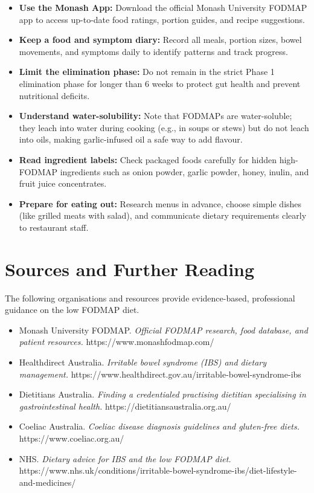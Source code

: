 \begin{itemize}
    \item \textbf{Use the Monash App:} Download the official Monash University FODMAP app to access up-to-date food ratings, portion guides, and recipe suggestions.
    \item \textbf{Keep a food and symptom diary:} Record all meals, portion sizes, bowel movements, and symptoms daily to identify patterns and track progress.
    \item \textbf{Limit the elimination phase:} Do not remain in the strict Phase 1 elimination phase for longer than 6 weeks to protect gut health and prevent nutritional deficits.
    \item \textbf{Understand water-solubility:} Note that FODMAPs are water-soluble; they leach into water during cooking (e.g., in soups or stews) but do not leach into oils, making garlic-infused oil a safe way to add flavour.
    \item \textbf{Read ingredient labels:} Check packaged foods carefully for hidden high-FODMAP ingredients such as onion powder, garlic powder, honey, inulin, and fruit juice concentrates.
    \item \textbf{Prepare for eating out:} Research menus in advance, choose simple dishes (like grilled meats with salad), and communicate dietary requirements clearly to restaurant staff.
\end{itemize}

\section*{Sources and Further Reading}
The following organisations and resources provide evidence-based, professional guidance on the low FODMAP diet.

\begin{itemize}
    \item Monash University FODMAP. \textit{Official FODMAP research, food database, and patient resources.} https://www.monashfodmap.com/
    \item Healthdirect Australia. \textit{Irritable bowel syndrome (IBS) and dietary management.} https://www.healthdirect.gov.au/irritable-bowel-syndrome-ibs
    \item Dietitians Australia. \textit{Finding a credentialed practising dietitian specialising in gastrointestinal health.} https://dietitiansaustralia.org.au/
    \item Coeliac Australia. \textit{Coeliac disease diagnosis guidelines and gluten-free diets.} https://www.coeliac.org.au/
    \item NHS. \textit{Dietary advice for IBS and the low FODMAP diet.} https://www.nhs.uk/conditions/irritable-bowel-syndrome-ibs/diet-lifestyle-and-medicines/
\end{itemize}
